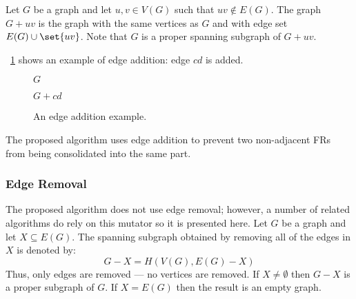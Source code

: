 Let \(G\) be a graph and let \(u,v\in V(G)\) such that \(uv\notin E(G)\).  The graph \(G+uv\) is the graph with the
same vertices as \(G\) and with edge set \(E(G)\cup\set{uv}\).  Note that \(G\) is a proper spanning subgraph of
\(G+uv\).

\figurename~\ref{fig:eadd} shows an example of edge addition: edge \(cd\) is added.

\begin{figure}[H]
  \begin{minipage}{2.75in}
    \centering

    \(G\)
  \end{minipage}
  \begin{minipage}{2.75in}
    \centering

    \(G+cd\)
  \end{minipage}
  \caption{An edge addition example.}
  \label{fig:eadd}
\end{figure}

The proposed algorithm uses edge addition to prevent two non-adjacent FRs from being consolidated into the same
part.

\subsubsection{Edge Removal}\label{sec:sub:sub:eremove}

The proposed algorithm does not use edge removal; however, a number of related algorithms do rely on this mutator
so it is presented here.  Let \(G\) be a graph and let \(X\subseteq E(G)\).  The spanning subgraph obtained by
removing all of the edges in \(X\) is denoted by:
\[G-X=H\left(V(G),E(G)-X\right)\]
Thus, only edges are removed --- no vertices are removed.  If \(X\ne\emptyset\) then \(G-X\) is a proper subgraph of
\(G\).  If \(X=E(G)\) then the result is an empty graph.

